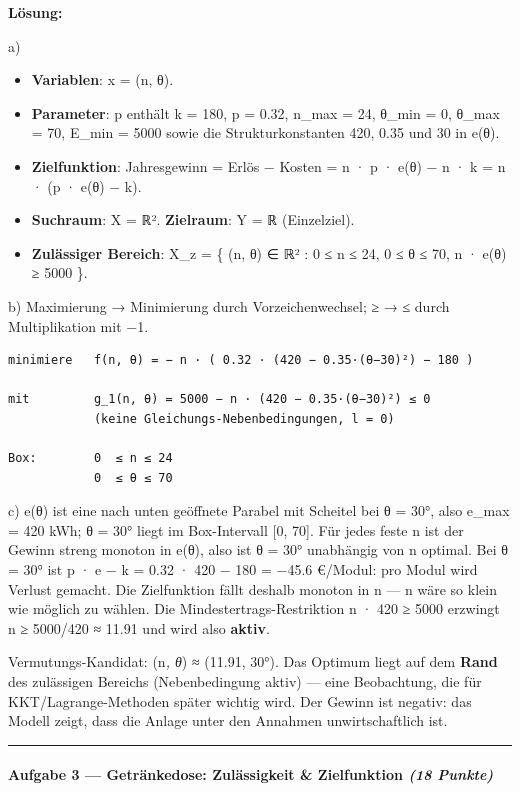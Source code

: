 \documentclass[11pt, a4paper]{article}
\begin{document}
\textbf{Lösung:}


a)

\begin{itemize}
  \item \textbf{Variablen}: x⃗ = (n, θ).
  \item \textbf{Parameter}: p⃗ enthält k = 180, p = 0.32, n\_max = 24, θ\_min = 0, θ\_max = 70, E\_min = 5000 sowie die Strukturkonstanten 420, 0.35 und 30 in e(θ).
  \item \textbf{Zielfunktion}: Jahresgewinn = Erlös − Kosten = n · p · e(θ) − n · k = n · (p · e(θ) − k).
  \item \textbf{Suchraum}: X = ℝ². \textbf{Zielraum}: Y = ℝ (Einzelziel).
  \item \textbf{Zulässiger Bereich}: X\_z = \{ (n, θ) ∈ ℝ² : 0 ≤ n ≤ 24, 0 ≤ θ ≤ 70, n · e(θ) ≥ 5000 \}.
\end{itemize}

b) Maximierung → Minimierung durch Vorzeichenwechsel; ≥ → ≤ durch Multiplikation mit −1.


\begin{lstlisting}
minimiere   f(n, θ) = − n · ( 0.32 · (420 − 0.35·(θ−30)²) − 180 )

mit         g_1(n, θ) = 5000 − n · (420 − 0.35·(θ−30)²) ≤ 0
            (keine Gleichungs-Nebenbedingungen, l = 0)

Box:        0  ≤ n ≤ 24
            0  ≤ θ ≤ 70
\end{lstlisting}


c) e(θ) ist eine nach unten geöffnete Parabel mit Scheitel bei θ = 30°, also e\_max = 420 kWh; θ = 30° liegt im Box-Intervall [0, 70]. Für jedes feste n ist der Gewinn streng monoton in e(θ), also ist θ = 30° unabhängig von n optimal. Bei θ = 30° ist p · e − k = 0.32 · 420 − 180 = −45.6 €/Modul: pro Modul wird Verlust gemacht. Die Zielfunktion fällt deshalb monoton in n — n wäre so klein wie möglich zu wählen. Die Mindestertrags-Restriktion n · 420 ≥ 5000 erzwingt n ≥ 5000/420 ≈ 11.91 und wird also \textbf{aktiv}.


Vermutungs-Kandidat: (n\textit{, θ}) ≈ (11.91, 30°). Das Optimum liegt auf dem \textbf{Rand} des zulässigen Bereichs (Nebenbedingung aktiv) — eine Beobachtung, die für KKT/Lagrange-Methoden später wichtig wird. Der Gewinn ist negativ: das Modell zeigt, dass die Anlage unter den Annahmen unwirtschaftlich ist.



\noindent\textcolor{rulegray}{\rule{\linewidth}{0.4pt}}


\paragraph{Aufgabe 3 — Getränkedose: Zulässigkeit \& Zielfunktion \textit{(18 Punkte)}}\mbox{}\\[2pt]
\end{document}
